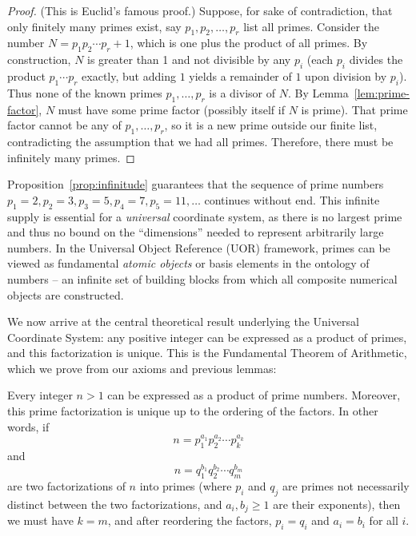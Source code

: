 \documentclass[11pt]{article}
\begin{document}
\begin{proof}
(This is Euclid's famous proof.) Suppose, for sake of contradiction, that only finitely many primes exist, say $p_1, p_2, \ldots, p_r$ list all primes. Consider the number $N = p_1 p_2 \cdots p_r + 1$, which is one plus the product of all primes. By construction, $N$ is greater than 1 and not divisible by any $p_i$ (each $p_i$ divides the product $p_1\cdots p_r$ exactly, but adding $1$ yields a remainder of $1$ upon division by $p_i$). Thus none of the known primes $p_1,\dots,p_r$ is a divisor of $N$. By Lemma~\ref{lem:prime-factor}, $N$ must have some prime factor (possibly itself if $N$ is prime). That prime factor cannot be any of $p_1,\dots,p_r$, so it is a new prime outside our finite list, contradicting the assumption that we had all primes. Therefore, there must be infinitely many primes.
\end{proof}

\begin{remark}
Proposition~\ref{prop:infinitude} guarantees that the sequence of prime numbers $p_1=2, p_2=3, p_3=5, p_4=7, p_5=11, \dots$ continues without end. This infinite supply is essential for a \emph{universal} coordinate system, as there is no largest prime and thus no bound on the “dimensions” needed to represent arbitrarily large numbers. In the Universal Object Reference (UOR) framework, primes can be viewed as fundamental \emph{atomic objects} or basis elements in the ontology of numbers -- an infinite set of building blocks from which all composite numerical objects are constructed.
\end{remark}

We now arrive at the central theoretical result underlying the Universal Coordinate System: any positive integer can be expressed as a product of primes, and this factorization is unique. This is the Fundamental Theorem of Arithmetic, which we prove from our axioms and previous lemmas:

\begin{theorem}\label{thm:FTA}
Every integer $n > 1$ can be expressed as a product of prime numbers. Moreover, this prime factorization is unique up to the ordering of the factors. In other words, if 
\[ n = p_1^{a_1} p_2^{a_2} \cdots p_k^{a_k} \]
and 
\[ n = q_1^{b_1} q_2^{b_2} \cdots q_m^{b_m} \]
are two factorizations of $n$ into primes (where $p_i$ and $q_j$ are primes not necessarily distinct between the two factorizations, and $a_i, b_j \ge 1$ are their exponents), then we must have $k=m$, and after reordering the factors, $p_i = q_i$ and $a_i = b_i$ for all $i$. 
\end{theorem}
\end{document}

